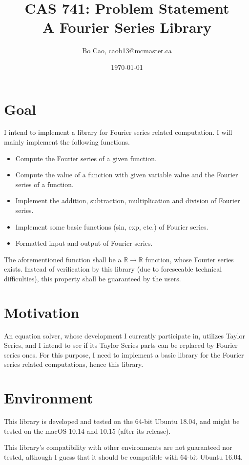 \documentclass{article}
\title{CAS 741: Problem Statement\\A Fourier Series Library}
\author{Bo Cao, caob13@mcmaster.ca}
\date{\today}
\begin{document}
\maketitle

\section{Goal}
I intend to implement a library for Fourier series related computation. I will mainly implement the following functions.
\begin{itemize}
	\item Compute the Fourier series of a given function.
	\item Compute the value of a function with given variable value and the Fourier series of a function.
	\item Implement the addition, subtraction, multiplication and division of Fourier series.
	\item Implement some basic functions (sin, exp, etc.) of Fourier series.
	\item Formatted input and output of Fourier series. 
\end{itemize}

The aforementioned function shall be a $\mathbb{R}\rightarrow\mathbb{R}$ function, whose Fourier series exists. Instead of verification by this library (due to foreseeable technical difficulties), this property shall be guaranteed by the users. 

\section{Motivation}
An equation solver, whose development I currently participate in, utilizes Taylor Series, and I intend to see if its Taylor Series parts can be replaced by Fourier series ones. For this purpose, I need to implement a basic library for the Fourier series related computations, hence this library.

\section{Environment}
This library is developed and tested on the 64-bit Ubuntu 18.04, and might be tested on the macOS 10.14 and 10.15 (after its release). 

This library's compatibility with other environments are not guaranteed nor tested, although I guess that it should be compatible with 64-bit Ubuntu 16.04.
  
\end{document}
